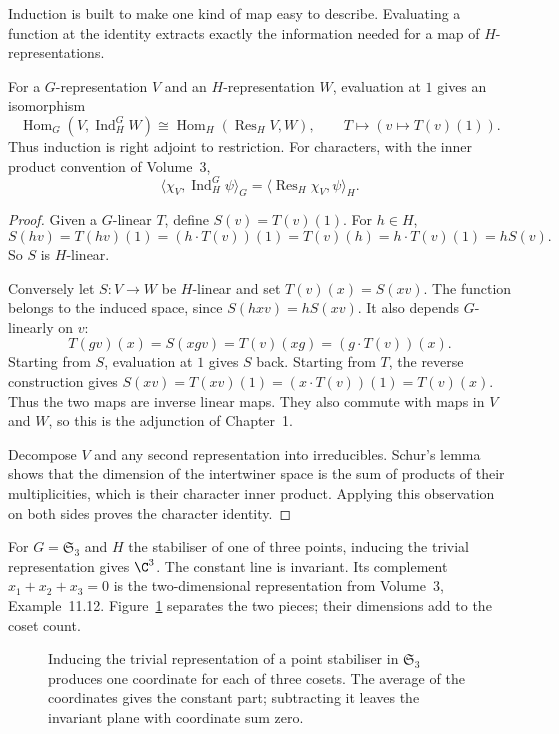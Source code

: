 Induction is built to make one kind of map easy to describe. Evaluating a function at the identity extracts exactly the information needed for a map of $H$-representations.

\begin{theorem}\label{thm:frobrecip}
For a $G$-representation $V$ and an $H$-representation $W$, evaluation at $1$ gives an isomorphism
\[
\operatorname{Hom}_G(V,\operatorname{Ind}_H^GW)
\cong\operatorname{Hom}_H(\operatorname{Res}_HV,W),
\qquad T\longmapsto(v\longmapsto T(v)(1)).
\]
Thus induction is right adjoint to restriction. For characters, with the inner product convention of Volume~3,
\[
\langle\chi_V,\operatorname{Ind}_H^G\psi\rangle_G
=\langle\operatorname{Res}_H\chi_V,\psi\rangle_H.
\]
\end{theorem}

\begin{proof}
Given a $G$-linear $T$, define $S(v)=T(v)(1)$. For $h\in H$,
\[
S(hv)=T(hv)(1)=(h\cdot T(v))(1)
=T(v)(h)=h\cdot T(v)(1)=hS(v).
\]
So $S$ is $H$-linear.

Conversely let $S:V\to W$ be $H$-linear and set $T(v)(x)=S(xv)$. The function belongs to the induced space, since $S(hxv)=hS(xv)$. It also depends $G$-linearly on $v$:
\[
T(gv)(x)=S(xgv)=T(v)(xg)=(g\cdot T(v))(x).
\]
Starting from $S$, evaluation at $1$ gives $S$ back. Starting from $T$, the reverse construction gives
$S(xv)=T(xv)(1)=(x\cdot T(v))(1)=T(v)(x)$.
Thus the two maps are inverse linear maps. They also commute with maps in $V$ and $W$, so this is the adjunction of Chapter~1.

Decompose $V$ and any second representation into irreducibles. Schur's lemma shows that the dimension of the intertwiner space is the sum of products of their multiplicities, which is their character inner product. Applying this observation on both sides proves the character identity.
\end{proof}

For $G=\mathfrak S_3$ and $H$ the stabiliser of one of three points, inducing the trivial representation gives $\C^3$. The constant line is invariant. Its complement $x_1+x_2+x_3=0$ is the two-dimensional representation from Volume~3, Example~11.12. Figure~\ref{fig:v10new-ch09-induction} separates the two pieces; their dimensions add to the coset count.

\begin{figure}[ht]
\centering
{}
\caption{Inducing the trivial representation of a point stabiliser in $\mathfrak S_3$ produces one coordinate for each of three cosets. The average of the coordinates gives the constant part; subtracting it leaves the invariant plane with coordinate sum zero.}
\label{fig:v10new-ch09-induction}
\end{figure}

